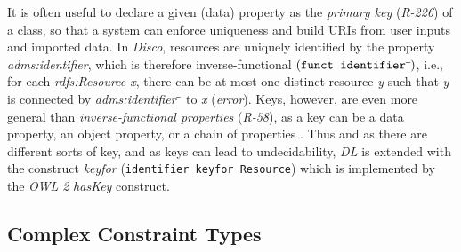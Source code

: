 \documentclass{llncs}
\newcommand{\ms}[1]{\texttt{#1}}
\newenvironment{DL}{
  \small
  \vspace{0cm}
	\begin{center}
  \begin{tabular}{c l}

}{
  \end{tabular}
	\end{center}
}
\begin{document}

It is often useful to declare a given (data) property as the \emph{primary key} (\emph{R-226}) of a class, so that a system can enforce uniqueness and build URIs from user inputs and imported data. 
In \emph{Disco}, resources are uniquely identified by the property \emph{adms:identifier},
which is therefore inverse-functional $(\ms{funct identifier}\sp{\overline{\ }})$,
i.e., for each \emph{rdfs:Resource x}, there can be at most one distinct resource \emph{y} such that \emph{y} is connected by \emph{adms:identifier$\sp{\overline{\ }}$} to \emph{x} (\emph{error}).
Keys, however, are even more general than \emph{inverse-functional properties} (\emph{R-58}),
as a key can be a data property, an object property, or a chain of properties \cite{Schneider2009}.
Thus and as there are different sorts of key, and as keys can lead to undecidability, 
\emph{DL} is extended with the construct \emph{keyfor} (\ms{identifier \ms{keyfor} Resource}) \cite{Lutz2005} which is implemented by the \emph{OWL 2} \emph{hasKey} construct.

\subsection{Complex Constraint Types}
\label{complex-constraint-types}

\end{document}
